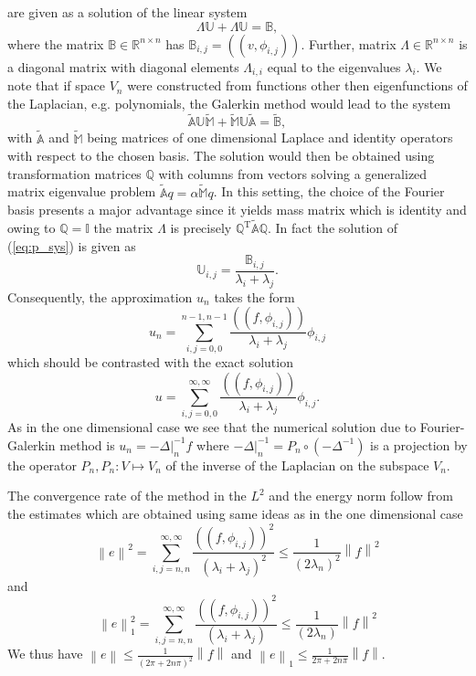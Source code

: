 \documentclass[a4paper,10pt]{article}
\newcommand{\R}{\ensuremath{\mathbb{R}}}
\newcommand{\norm}[1]{\ensuremath{\left\|#1\right\|}}
\newcommand{\Inner}[2]{\ensuremath{\left(\left(#1, #2\right)\right)}}
\begin{document}
  are given as a solution of the linear system
  \begin{equation}
    \label{eq:p_sys}
    \Lambda\mathbb{U} + \Lambda\mathbb{U} = \mathbb{B},
  \end{equation}
  where the matrix $\mathbb{B}\in\R^{n\times n}$ has $\mathbb{B}_{i,
  j}=\Inner{v}{\phi_{i, j}}$. Further, matrix $\Lambda\in\R^{n\times n}$ is
  a diagonal matrix with diagonal elements $\Lambda_{i, i}$ equal to the
  eigenvalues $\lambda_i$. We note that if space $V_n$ were constructed from 
  functions other then eigenfunctions of the Laplacian, e.g. polynomials, the
  Galerkin method would lead to the system
  \[
    \tilde{\mathbb{A}}\mathbb{U}\tilde{\mathbb{M}} +
    \tilde{\mathbb{M}}\mathbb{U}\tilde{\mathbb{A}} =
    \tilde{\mathbb{B}},
  \]
  with $\tilde{\mathbb{A}}$ and $\tilde{\mathbb{M}}$ being matrices of one
  dimensional Laplace and identity operators with respect to the chosen basis.
  The solution would then be obtained using transformation matrices $\mathbb{Q}$
  with columns from vectors solving a generalized matrix eigenvalue problem
  $\tilde{\mathbb{A}}q=\alpha\tilde{\mathbb{M}}q$.
  In this setting, the choice of the Fourier basis presents a major advantage
  since it yields mass matrix which is identity and owing to
  $\mathbb{Q}=\mathbb{I}$ the matrix $\Lambda$ is precisely
  $\mathbb{Q}^{\text{T}}\tilde{\mathbb{A}}\mathbb{Q}$. In fact the solution
  of (\ref{eq:p_sys}) is given as
  \[
    \mathbb{U}_{i, j} = \frac{\mathbb{B}_{i, j}}{\lambda_i + \lambda_j}.
  \]
  Consequently, the approximation $u_n$ takes the form
  \[
    u_n = \sum\limits_{i, j = 0, 0}^{n-1, n-1}\frac{\Inner{f}{\phi_{i, j}}}{\lambda_i + \lambda_j}
    \phi_{i, j}
  \]
  which should be contrasted with the exact solution
  \[
    u = \sum\limits_{i, j = 0, 0}^{\infty, \infty}\frac{\Inner{f}{\phi_{i, j}}}{\lambda_i + \lambda_j}
    \phi_{i, j}.
  \]
  As in the one dimensional case we see that the numerical solution due to
  Fourier-Galerkin method is $u_n = -\Delta|_{n}^{-1}f$ where
  $-\Delta|_{n}^{-1}=P_n \circ \left(-\Delta^{-1}\right)$ is a projection by 
  the operator $P_n, P_n:V\mapsto V_n$ of the inverse of the Laplacian on the
  subspace $V_n$.

  The convergence rate of the method in the $L^2$ and the energy norm follow
  from the estimates which are obtained using same ideas as in the one
  dimensional case
  \[
    \norm{e}^2 = \sum\limits_{i, j = n, n}^{\infty,
    \infty}\frac{\Inner{f}{\phi_{i, j}}^2}{\left(\lambda_i + \lambda_j\right)^2}
      \leq
      \frac{1}{\left(2\lambda_n\right)^2}\norm{f}^2
  \]
  and
\[
    \norm{e}_1^2 = \sum\limits_{i, j = n, n}^{\infty,
    \infty}\frac{\Inner{f}{\phi_{i, j}}^2}{\left(\lambda_i + \lambda_j\right)}
      \leq
      \frac{1}{\left(2\lambda_n\right)}\norm{f}^2
  \]
  We thus have $\norm{e}\leq\frac{1}{\left(2\pi + 2n\pi\right)^2}\norm{f}$ and
  $\norm{e}_1\leq\frac{1}{2\pi + 2n\pi}\norm{f}$.
\end{document}
